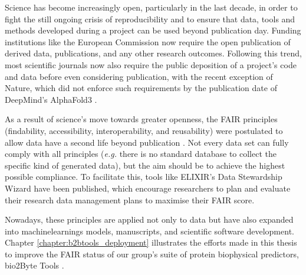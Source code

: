 Science has become increasingly open, particularly in the last decade, in order to fight the still ongoing crisis of reproducibility and to ensure that data, tools and methods developed during a project can be used beyond publication day. Funding institutions like the European Commission now require the open publication of derived data, publications, and any other research outcomes. Following this trend, most scientific journals now also require the public deposition of a project’s code and data before even considering publication, with the recent exception of Nature, which did not enforce such requirements by the publication date of DeepMind’s AlphaFold3  \cite{noauthor_alphafold3_2024}.

As a result of science’s move towards greater openness, the FAIR principles (\Gls{findability}, \Gls{accessibility}, \Gls{interoperability}, and \Gls{reusability}) were postulated to allow data have a second life beyond publication \cite{jacobsen_fair_2020}. Not every data set can fully comply with all principles (\textit{e.g.} there is no standard database to collect the specific kind of generated data), but the aim should be to achieve the highest possible compliance. To facilitate this, tools like ELIXIR's Data Stewardship Wizard \cite{pergl_data_2019, devignes_experiences_2023} have been published, which encourage researchers to plan and evaluate their research data management plans to maximise their FAIR score.

Nowadays, these principles are applied not only to data but have also expanded into \glspl{machinelearning} models, manuscripts, and scientific software development. Chapter \ref{chapter:b2btools_deployment} illustrates the efforts made in this thesis to improve the FAIR status of our group's suite of protein biophysical predictors, bio2Byte Tools \cite{gavalda-garcia_bio2byte_2024}. 


